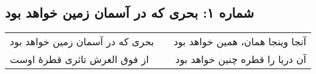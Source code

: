 \begin{center}
\section*{شماره ۱: بحری که در آسمان زمین خواهد بود}
\label{sec:001}
\begin{longtable}{l p{0.5cm} r}
بحری که در آسمان زمین خواهد بود
&&
آنجا وینجا همان، همین خواهد بود
\\
از فوق العرش تاثری قطرهٔ اوست
&&
آن دریا را قطره چنین خواهد بود
\\
\end{longtable}
\end{center}
